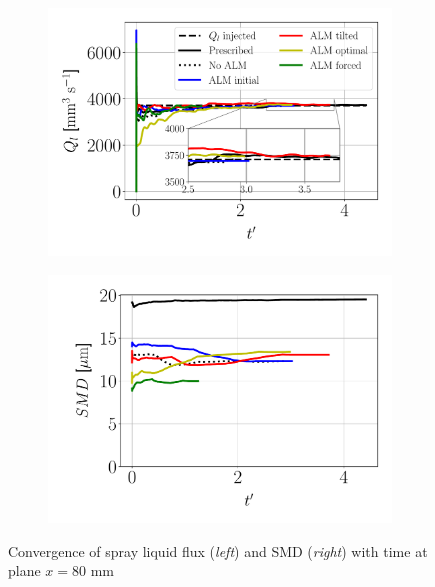 \begin{figure}[ht]
\flushleft
\begin{subfigure}[b]{0.45\textwidth}
	\centering
   \includegraphics[scale=0.36]{./part2_developments/figures_ch6_lagrangian_JICF/params_gaseous_initial_conditions/convergence_Ql}
\end{subfigure}
\hspace{0.4in}
\begin{subfigure}[b]{0.45\textwidth}
	\centering
   \includegraphics[scale=0.36]{./part2_developments/figures_ch6_lagrangian_JICF/params_gaseous_initial_conditions/convergence_SMD}
\end{subfigure}
\caption{Convergence of spray liquid flux (\textsl{left}) and SMD (\textsl{right}) with time at plane $x = 80$ mm}
\label{fig:LGS_QL_and_SMD_convergence_with_time}
\end{figure}



